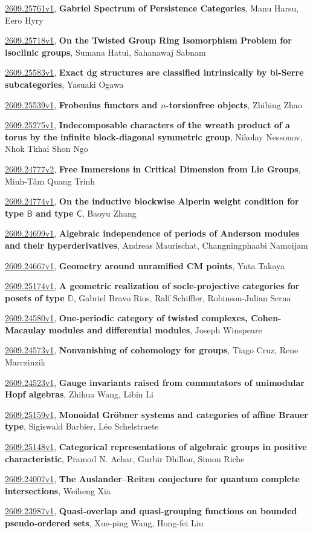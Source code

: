 \documentclass[9pt, a4paper]{article}
\theoremstyle{plain}
\theoremstyle{definition}
\theoremstyle{remark}
\newcommand{\arxiv}[3]{\href{https://arxiv.org/abs/#1}{#1}, \textbf{\textcolor{arxivblue}{#2}}, #3}
\begin{document}
\arxiv{2609.25761v1}{Gabriel Spectrum of Persistence Categories}{Manu Harsu, Eero Hyry}

\arxiv{2609.25718v1}{On the Twisted Group Ring Isomorphism Problem for isoclinic groups}{Sumana Hatui, Sahanawaj Sabnam}

\arxiv{2609.25583v1}{Exact dg structures are classified intrinsically by bi-Serre subcategories}{Yasuaki Ogawa}

\arxiv{2609.25539v1}{Frobenius functors and $n$-torsionfree objects}{Zhibing Zhao}

\arxiv{2609.25275v1}{Indecomposable characters of the wreath product of a torus by the infinite block-diagonal symmetric group}{Nikolay Nessonov, Nhok Tkhai Shon Ngo}

\arxiv{2609.24777v2}{Free Immersions in Critical Dimension from Lie Groups}{Minh-Tâm Quang Trinh}

\arxiv{2609.24774v1}{On the inductive blockwise Alperin weight condition for type $\mathsf B$ and type $\mathsf C$}{Baoyu Zhang}

\arxiv{2609.24699v1}{Algebraic independence of periods of Anderson modules and their hyperderivatives}{Andreas Maurischat, Changningphaabi Namoijam}

\arxiv{2609.24667v1}{Geometry around unramified CM points}{Yuta Takaya}

\arxiv{2609.25174v1}{A geometric realization of socle-projective categories for posets of type $\mathbb{D}$}{Gabriel Bravo Rios, Ralf Schiffler, Robinson-Julian Serna}

\arxiv{2609.24580v1}{One-periodic category of twisted complexes, Cohen-Macaulay modules and differential modules}{Joseph Winspeare}

\arxiv{2609.24573v1}{Nonvanishing of cohomology for groups}{Tiago Cruz, Rene Marczinzik}

\arxiv{2609.24523v1}{Gauge invariants raised from commutators of unimodular Hopf algebras}{Zhihua Wang, Libin Li}

\arxiv{2609.25159v1}{Monoidal Gröbner systems and categories of affine Brauer type}{Sigiswald Barbier, Léo Schelstraete}

\arxiv{2609.25148v1}{Categorical representations of algebraic groups in positive characteristic}{Pramod N. Achar, Gurbir Dhillon, Simon Riche}

\arxiv{2609.24007v1}{The Auslander--Reiten conjecture for quantum complete intersections}{Weiheng Xia}

\arxiv{2609.23987v1}{Quasi-overlap and quasi-grouping functions on bounded pseudo-ordered sets}{Xue-ping Wang, Hong-fei Liu}
\end{document}

